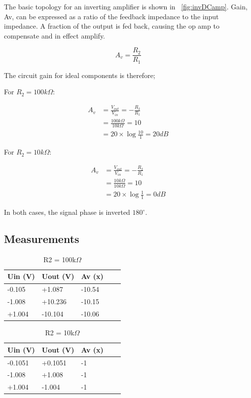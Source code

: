 \documentclass[]{article}
\begin{document}
The basic topology for an inverting amplifier is shown in ~\ref{fig:invDCamp}.
Gain, Av, can be expressed as a ratio of the feedback impedance to the
input impedance. A fraction of the output is fed back, causing the op
amp to compensate and in effect amplify.

\begin{equation}
    A_v = \frac{R_2}{R_1}
\end{equation}

The circuit gain for ideal components is therefore;

For $R_2 = 100k\Omega$:

\begin{align} 
A_v     &= \frac{V_{out}}{V_{in}} = -\frac{R_2}{R_1}\\
        &= \frac{100k\Omega}{10k\Omega} = 10\\
        &= 20 \times \log{\frac{10}{1}} = 20dB  
\end{align}

For $R_2 = 10k\Omega$:

\begin{align} 
A_v     &= \frac{V_{out}}{V_{in}} = -\frac{R_2}{R_1}\\
        &= \frac{10k\Omega}{10k\Omega} = 10\\
        &= 20 \times \log{\frac{1}{1}} = 0dB  
\end{align}

In both cases, the signal phase is inverted $180^\circ$.

\subsection{Measurements}\label{measurements}
\begin{table}[h]
  \centering
  \begin{tabular}{@{}lllll@{}}
    \toprule
    Uin (V) & Uout (V) & Av (x) &  &  \\ \midrule
    -0.105 & +1.087  & -10.54     &  &  \\
    -1.008  & +10.236   & -10.15     &  &  \\
    +1.004  & -10.104   & -10.06     &  &  \\ \bottomrule
  \end{tabular}
  \caption{R2 = 100k$\Omega$}
  \label{invDCtable1}
\end{table}

\begin{table}[h]
  \centering
  \begin{tabular}{@{}lllll@{}}
    \toprule
    Uin (V) & Uout (V) & Av (x) &  &  \\ \midrule
    -0.1051 & +0.1051  & -1     &  &  \\
    -1.008  & +1.008   & -1     &  &  \\
    +1.004  & -1.004   & -1     &  &  \\ \bottomrule
  \end{tabular}
  \caption{R2 = 10k$\Omega$}
  \label{invDCtable2}
\end{table}
\end{document}
